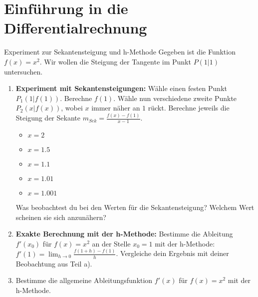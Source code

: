 \section{Einführung in die Differentialrechnung}
\label{sec:differentialrechnung}

\begin{aufgabenumgebung}{Experiment zur Sekantensteigung und h-Methode}
Gegeben ist die Funktion $f(x) = x^2$. Wir wollen die Steigung der Tangente im Punkt $P(1|1)$ untersuchen.
\begin{enumerate}
    \item \textbf{Experiment mit Sekantensteigungen:}
        Wähle einen festen Punkt $P_1(1|f(1))$. Berechne $f(1)$.
        Wähle nun verschiedene zweite Punkte $P_2(x|f(x))$, wobei $x$ immer näher an $1$ rückt. Berechne jeweils die Steigung der Sekante $m_{Sek} = \frac{f(x)-f(1)}{x-1}$.
        \begin{itemize}
            \item $x = 2$
            \item $x = 1.5$
            \item $x = 1.1$
            \item $x = 1.01$
            \item $x = 1.001$
        \end{itemize}
        Was beobachtest du bei den Werten für die Sekantensteigung? Welchem Wert scheinen sie sich anzunähern?
    \item \textbf{Exakte Berechnung mit der h-Methode:}
        Bestimme die Ableitung $f'(x_0)$ für $f(x)=x^2$ an der Stelle $x_0=1$ mit der h-Methode:
        $f'(1) = \lim_{h \to 0} \frac{f(1+h) - f(1)}{h}$.
        Vergleiche dein Ergebnis mit deiner Beobachtung aus Teil a).
    \item Bestimme die allgemeine Ableitungsfunktion $f'(x)$ für $f(x)=x^2$ mit der h-Methode.
\end{enumerate}
\end{aufgabenumgebung}


